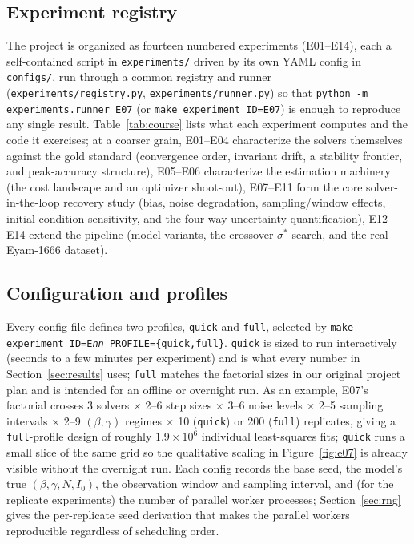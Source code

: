 \label{sec:implementation}
\subsection{Experiment registry}
The project is organized as fourteen numbered experiments (E01--E14), each a self-contained script
in \texttt{experiments/} driven by its own YAML config in \texttt{configs/}, run through a common
registry and runner (\texttt{experiments/registry.py}, \texttt{experiments/runner.py}) so that
\texttt{python -m experiments.runner E07} (or \texttt{make experiment ID=E07}) is enough to
reproduce any single result. Table~\ref{tab:course} lists what each experiment computes and the
code it exercises; at a coarser grain, E01--E04 characterize the solvers themselves against the
gold standard (convergence order, invariant drift, a stability frontier, and peak-accuracy
structure), E05--E06 characterize the estimation machinery (the cost landscape and an
optimizer shoot-out), E07--E11 form the core solver-in-the-loop recovery study (bias, noise
degradation, sampling/window effects, initial-condition sensitivity, and the four-way uncertainty
quantification), E12--E14 extend the pipeline (model variants, the crossover $\sigma^*$
search, and the real Eyam-1666 dataset).

\subsection{Configuration and profiles}
Every config file defines two profiles, \texttt{quick} and \texttt{full}, selected by
\texttt{make experiment ID=E\emph{nn} PROFILE=\{quick,full\}}. \texttt{quick} is sized to run
interactively (seconds to a few minutes per experiment) and is what every number in
Section~\ref{sec:results} uses; \texttt{full} matches the factorial sizes in our original
project plan and is intended for an offline or overnight run. As an example, E07's factorial
crosses 3 solvers $\times$ 2--6 step sizes $\times$ 3--6 noise levels $\times$ 2--5 sampling
intervals $\times$ 2--9 $(\beta,\gamma)$ regimes $\times$ 10 (\texttt{quick}) or 200
(\texttt{full}) replicates, giving a \texttt{full}-profile design of roughly $1.9\times10^6$
individual least-squares fits; \texttt{quick} runs a small slice of the same grid so the
qualitative scaling in Figure~\ref{fig:e07} is already visible without the overnight run. Each
config records the base seed, the model's true $(\beta,\gamma,N,I_0)$, the observation window and
sampling interval, and (for the replicate experiments) the number of parallel worker processes;
Section~\ref{sec:rng} gives the per-replicate seed derivation that makes the parallel workers
reproducible regardless of scheduling order.

